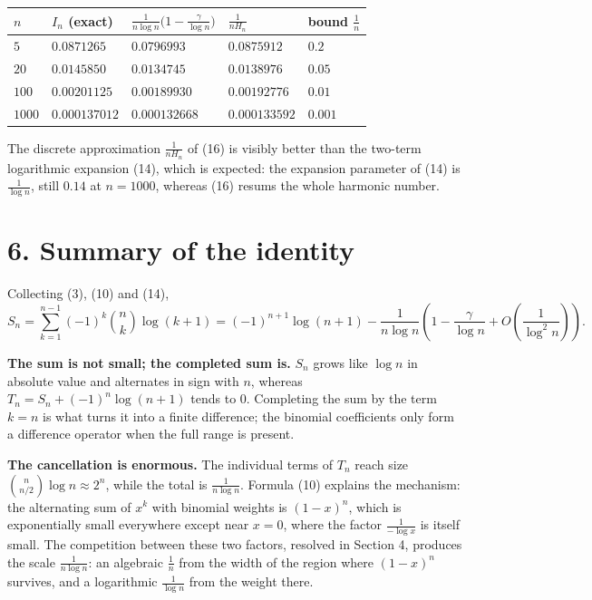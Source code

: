 \documentclass[12pt]{article}
\newcommand{\Sn}{S_n}
\newcommand{\Tn}{T_n}
\newcommand{\In}{I_n}
\newcommand{\Hh}{H}
\begin{document}
\begin{center}
\small
\renewcommand{\arraystretch}{1.35}
\begin{tabularx}{0.95\textwidth}{@{}lXXXX@{}}
\toprule
\(n\) & \(\In\) (exact) & \(\frac1{n\log n}\bigl(1-\frac\gamma{\log n}\bigr)\) & \(\frac1{n\Hh_n}\) & bound \(\frac1n\) \\
\midrule
\(5\)    & \(0.0871265\)   & \(0.0796993\)   & \(0.0875912\)   & \(0.2\) \\
\(20\)   & \(0.0145850\)   & \(0.0134745\)   & \(0.0138976\)   & \(0.05\) \\
\(100\)  & \(0.00201125\)  & \(0.00189930\)  & \(0.00192776\)  & \(0.01\) \\
\(1000\) & \(0.000137012\) & \(0.000132668\) & \(0.000133592\) & \(0.001\) \\
\bottomrule
\end{tabularx}
\end{center}

The discrete approximation \(\frac1{n\Hh_n}\) of (16) is visibly better
than the two-term logarithmic expansion (14), which is expected: the
expansion parameter of (14) is \(\frac1{\log n}\), still \(0.14\) at
\(n=1000\), whereas (16) resums the whole harmonic number.

\section*{6. Summary of the identity}

Collecting (3), (10) and (14),
\[
\Sn=\sum_{k=1}^{n-1}(-1)^k\binom nk\log(k+1)
=(-1)^{n+1}\log(n+1)
-\frac1{n\log n}\left(1-\frac{\gamma}{\log n}
+O\!\left(\frac1{\log^2 n}\right)\right).
\]


\textbf{The sum is not small; the completed sum is.} \(\Sn\) grows like
\(\log n\) in absolute value and alternates in sign with \(n\), whereas
\(\Tn=\Sn+(-1)^n\log(n+1)\) tends to \(0\). Completing the sum by the
term \(k=n\) is what turns it into a finite difference; the binomial
coefficients only form a difference operator when the full range is
present.

\textbf{The cancellation is enormous.} The individual terms of \(\Tn\)
reach size \(\binom{n}{n/2}\log n\approx2^n\), while the total is
\(\frac1{n\log n}\). Formula (10) explains the mechanism: the alternating
sum of \(x^k\) with binomial weights is \((1-x)^n\), which is
exponentially small everywhere except near \(x=0\), where the factor
\(\frac1{-\log x}\) is itself small. The competition between these two
factors, resolved in Section 4, produces the scale
\(\frac1{n\log n}\): an algebraic \(\frac1n\) from the width of the
region where \((1-x)^n\) survives, and a logarithmic \(\frac1{\log n}\)
from the weight there.
\end{document}
